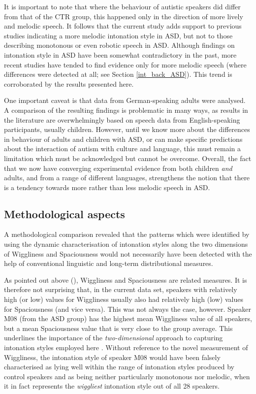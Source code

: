 It is important to note that where the behaviour of autistic speakers did differ from that of the CTR group, this happened only in the direction of more lively and melodic speech. It follows that the current study adds support to previous studies indicating a more melodic intonation style in ASD, but not to those describing monotonous or even robotic speech in ASD. Although findings on intonation style in ASD have been somewhat contradictory in the past, more recent studies have tended to find evidence only for more melodic speech (where differences were detected at all; see Section \ref{int_back_ASD}). This trend is corroborated by the results presented here.

One important caveat is that data from German-speaking adults were analysed. A comparison of the resulting findings is problematic in many ways, as results in the literature are overwhelmingly based on speech data from English-speaking participants, usually children. However, until we know more about the differences in behaviour of adults and children with ASD, or can make specific predictions about the interaction of autism with culture and language, this must remain a limitation which must be acknowledged but cannot be overcome. Overall, the fact that we now have converging experimental evidence from both children \emph{and} adults, and from a range of different languages, strengthens the notion that there is a tendency towards more rather than less melodic speech in ASD.


	\subsection{Methodological aspects}\label{int_disc_methods}

A methodological comparison revealed that the patterns which were identified by using the dynamic characterisation of intonation styles along the two dimensions of Wiggliness and Spaciousness would not necessarily have been detected with the help of conventional linguistic and long-term distributional measures.

As pointed out above (), Wiggliness and Spaciousness are related measures. It is therefore not surprising that, in the current data set, speakers with relatively high (or low) values for Wiggliness usually also had relatively high (low) values for Spaciousness (and vice versa). This was not always the case, however. Speaker M08 (from the ASD group) has the highest mean Wiggliness value of all speakers, but a mean Spaciousness value that is very close to the group average. This underlines the importance of the \emph{two-dimensional} approach to capturing intonation styles employed here \citep[for further evidence supporting distinct functions and the partial independece of Wiggliness and Spaciousness, see][]{wehrleEvaluatingProsodicAspects2023}. Without reference to the novel measurement of Wiggliness, the intonation style of speaker M08 would have been falsely characterised as lying well within the range of intonation styles produced by control speakers and as being neither particularly monotonous nor melodic, when it in fact represents the \textit{wiggliest} intonation style out of all 28 speakers.


